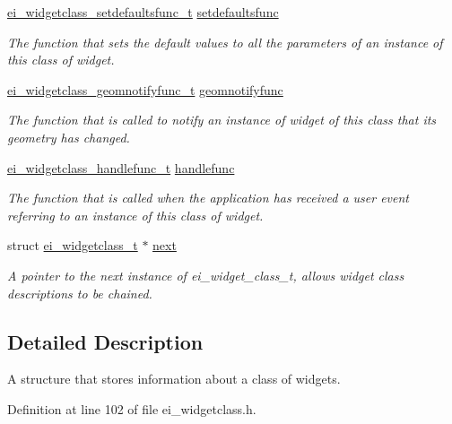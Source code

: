 \begin{DoxyCompactItemize}
\hyperlink{ei__widgetclass_8h_a6eb8e0ab7122c60cb5262a8cc72a3777}{ei\+\_\+widgetclass\+\_\+setdefaultsfunc\+\_\+t} \hyperlink{structei__widgetclass__t_a5fec706eefca10172d897cf61b268510}{setdefaultsfunc}
\begin{DoxyCompactList}\small\item\em The function that sets the default values to all the parameters of an instance of this class of widget. \end{DoxyCompactList}\item 
\hyperlink{ei__widgetclass_8h_a61e618cc48a96d87fd3275530adc35e2}{ei\+\_\+widgetclass\+\_\+geomnotifyfunc\+\_\+t} \hyperlink{structei__widgetclass__t_aaf0aa3f54a48a6b3f8b8e12574ede4b7}{geomnotifyfunc}
\begin{DoxyCompactList}\small\item\em The function that is called to notify an instance of widget of this class that its geometry has changed. \end{DoxyCompactList}\item 
\hyperlink{ei__widgetclass_8h_a480d59667e6726294cd961accf180241}{ei\+\_\+widgetclass\+\_\+handlefunc\+\_\+t} \hyperlink{structei__widgetclass__t_a5ed633370e3c90d21244d93d5467227e}{handlefunc}
\begin{DoxyCompactList}\small\item\em The function that is called when the application has received a user event referring to an instance of this class of widget. \end{DoxyCompactList}\item 
struct \hyperlink{structei__widgetclass__t}{ei\+\_\+widgetclass\+\_\+t} $\ast$ \hyperlink{structei__widgetclass__t_aa184e650475ec2451f033858db1876f0}{next}
\begin{DoxyCompactList}\small\item\em A pointer to the next instance of ei\+\_\+widget\+\_\+class\+\_\+t, allows widget class descriptions to be chained. \end{DoxyCompactList}\end{DoxyCompactItemize}


\subsection{Detailed Description}
A structure that stores information about a class of widgets. 

Definition at line 102 of file ei\+\_\+widgetclass.\+h.



